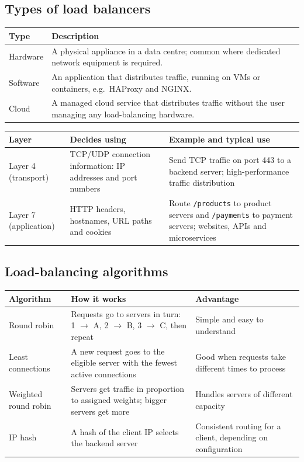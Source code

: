 \documentclass[11pt,a4paper]{article}
\begin{document}
\subsection{Types of load balancers}


\begin{tabularx}{\textwidth}{@{}lX@{}}
\toprule
\rowcolor{tablehead}\textbf{Type} & \textbf{Description} \\
\midrule
Hardware & A physical appliance in a data centre; common where dedicated network equipment is
  required. \\
Software & An application that distributes traffic, running on VMs or containers, e.g.\
  HAProxy and NGINX. \\
Cloud & A managed cloud service that distributes traffic without the user managing any
  load-balancing hardware. \\
\bottomrule
\end{tabularx}


\begin{tabularx}{\textwidth}{@{}lXX@{}}
\toprule
\rowcolor{tablehead}\textbf{Layer} & \textbf{Decides using} & \textbf{Example and typical
  use} \\
\midrule
Layer 4 (transport) & TCP/UDP connection information: IP addresses and port numbers & Send TCP
  traffic on port 443 to a backend server; high-performance traffic distribution \\
\addlinespace
Layer 7 (application) & HTTP headers, hostnames, URL paths and cookies & Route
  \texttt{/products} to product servers and \texttt{/payments} to payment servers; websites,
  APIs and microservices \\
\bottomrule
\end{tabularx}


\subsection{Load-balancing algorithms}

\begin{tabularx}{\textwidth}{@{}lXX@{}}
\toprule
\rowcolor{tablehead}\textbf{Algorithm} & \textbf{How it works} & \textbf{Advantage} \\
\midrule
Round robin & Requests go to servers in turn: 1 $\rightarrow$ A, 2 $\rightarrow$ B,
  3 $\rightarrow$ C, then repeat & Simple and easy to understand \\
\addlinespace
Least connections & A new request goes to the eligible server with the fewest active
  connections & Good when requests take different times to process \\
\addlinespace
Weighted round robin & Servers get traffic in proportion to assigned weights; bigger servers
  get more & Handles servers of different capacity \\
\addlinespace
IP hash & A hash of the client IP selects the backend server & Consistent routing for a
  client, depending on configuration \\
\bottomrule
\end{tabularx}
\end{document}
